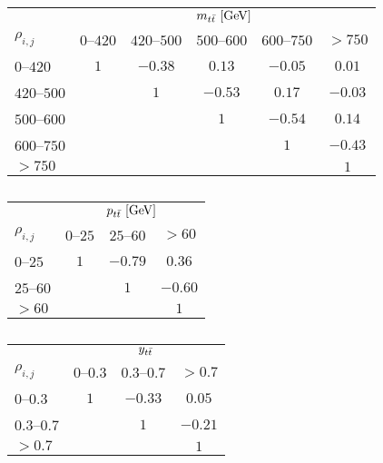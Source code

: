 \begin{table}[!htp]\centering
\caption{ }
\begin{tabular}{l c c c c c }
  \toprule
  &\multicolumn{5}{c}{$m_{t\bar{t}}{}~[\rm{GeV}]$}    \\
  $\rho_{i,j}$ & $0$--$420$ & $420$--$500$ & $500$--$600$ & $600$--$750$ & $>750$ \\
  \midrule
  $0$--$420$      & $1$ & $-0.38$ & $0.13$  & $-0.05$ & $0.01$  \\
  $420$--$500$    &     & $1$     & $-0.53$ & $0.17$  & $-0.03$ \\
  $500$--$600$    &     &         & $1$     & $-0.54$ & $0.14$  \\
  $600$--$750$    &     &         &         & $1$     & $-0.43$ \\
  $>750$          &     &         &         &         & $1$     \\
  \bottomrule
\end{tabular}
\label{tab:corr_mtt}
\end{table}

\begin{table}[!htp]\centering
\caption{ }
\begin{tabular}{l c c c }
  \toprule
  &\multicolumn{3}{c}{$p_{t\bar{t}}{}~[\rm{GeV}]$}    \\
  $\rho_{i,j}$      &     $0$--$25$           &        $25$--$60$         &  $>60$            \\
  \midrule
  $0$--$25$       &    $1$    &    $-0.79$  &   $0.36$  \\
  $25$--$60$      &           &    $1$      &   $-0.60$ \\
  $>60$           &           &             &   $1$     \\
  \bottomrule
\end{tabular}
\label{tab:corr_pttt}
\end{table}

\begin{table}[!htp]\centering
\caption{ }
\begin{tabular}{l c c c }
  \toprule
  &\multicolumn{3}{c}{$y_{t\bar{t}}{}$}    \\
  $\rho_{i,j}$      &  $0$--$0.3$   &  $0.3$--$0.7$  &  $>0.7$  \\
  \midrule
  $0$--$0.3$    &   $1$   &   $-0.33$  &   $0.05$   \\
  $0.3$--$0.7$  &         &   $1$      &   $-0.21$  \\
  $>0.7$        &         &            &   $1$      \\
  \bottomrule
\end{tabular}
\label{tab:corr_ytt}
\end{table}

